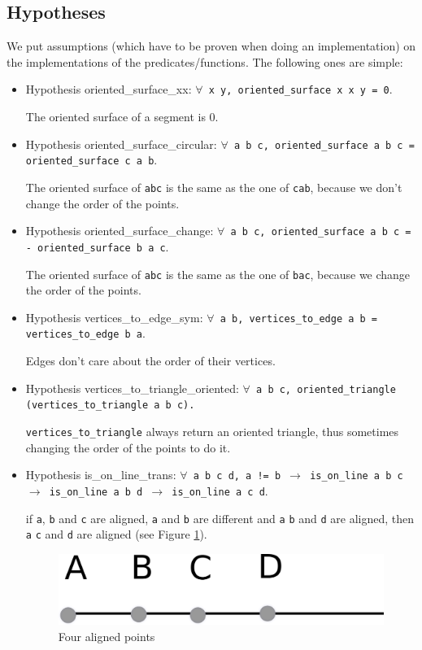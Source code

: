 \documentclass[a4paper,10pt]{article}
\def\hypothesis#1#2{{\color{purple}Hypothesis} {\color{blue}#1}: {\tt #2}}
\begin{document}
  \subsection{Hypotheses}
\label{Hypothesis}
We put assumptions (which have to be proven when doing an implementation) on the implementations of the predicates/functions. The following ones are simple:
\begin{itemize}
\item \hypothesis{oriented\_surface\_xx}{$\forall$ x y, {\tt oriented\_surface x x y} = 0}.
  
  The oriented surface of a segment is 0.
\item \hypothesis{oriented\_surface\_circular}{$\forall$ a b c, oriented\_surface a b c = oriented\_surface c a b}.
  
  The oriented surface of {\tt abc} is the same as the one of {\tt cab}, because we don't change the order of the points.
\item \hypothesis{oriented\_surface\_change}{$\forall$ a b c, oriented\_surface a b c = - oriented\_surface b a c}.
  
  The oriented surface of {\tt abc} is the same as the one of {\tt bac}, because we change the order of the points.
\item \hypothesis{vertices\_to\_edge\_sym}{$\forall$ a b, vertices\_to\_edge a b = vertices\_to\_edge b a}.

  Edges don't care about the order of their vertices.
  \item 
    \hypothesis{vertices\_to\_triangle\_oriented}{$\forall$ a b c, oriented\_triangle (vertices\_to\_triangle a b c).}

    {\tt vertices\_to\_triangle} always return an oriented triangle, thus sometimes changing the order of the points to do it.
\item\hypothesis{is\_on\_line\_trans}{$\forall$ a b c d, a != b $\rightarrow$ is\_on\_line a b c $\rightarrow$ is\_on\_line a b d $\rightarrow$
    is\_on\_line a c d}.
  
  if {\tt a}, {\tt b} and {\tt c} are aligned, {\tt a} and {\tt b} are different and {\tt a} {\tt b} and {\tt d} are aligned, then {\tt a} {\tt c} and {\tt d} are aligned (see Figure \ref{aligned}).

  \begin{figure}
    \centering
    \includegraphics{aligned}
    \caption{\label{aligned} Four aligned points}
  \end{figure}
  

\end{itemize}
\end{document}
